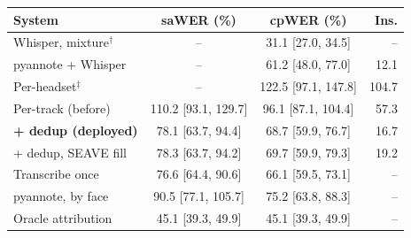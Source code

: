 \begin{tabular}{@{}lccr@{}}
\toprule
System & saWER (\%) & cpWER (\%) & Ins. \\
\midrule
Whisper, mixture$^\dagger$ & -- & 31.1 {\scriptsize[27.0, 34.5]} & -- \\
pyannote + Whisper & -- & 61.2 {\scriptsize[48.0, 77.0]} & 12.1 \\
Per-headset$^\ddagger$ & -- & 122.5 {\scriptsize[97.1, 147.8]} & 104.7 \\
\midrule
Per-track (before) & 110.2 {\scriptsize[93.1, 129.7]} & 96.1 {\scriptsize[87.1, 104.4]} & 57.3 \\
\textbf{+ dedup (deployed)} & 78.1 {\scriptsize[63.7, 94.4]} & 68.7 {\scriptsize[59.9, 76.7]} & 16.7 \\
\midrule
+ dedup, SEAVE fill & 78.3 {\scriptsize[63.7, 94.2]} & 69.7 {\scriptsize[59.9, 79.3]} & 19.2 \\
Transcribe once & 76.6 {\scriptsize[64.4, 90.6]} & 66.1 {\scriptsize[59.5, 73.1]} & -- \\
pyannote, by face & 90.5 {\scriptsize[77.1, 105.7]} & 75.2 {\scriptsize[63.8, 88.3]} & -- \\
\midrule
Oracle attribution & 45.1 {\scriptsize[39.3, 49.9]} & 45.1 {\scriptsize[39.3, 49.9]} & -- \\
\bottomrule
\end{tabular}
